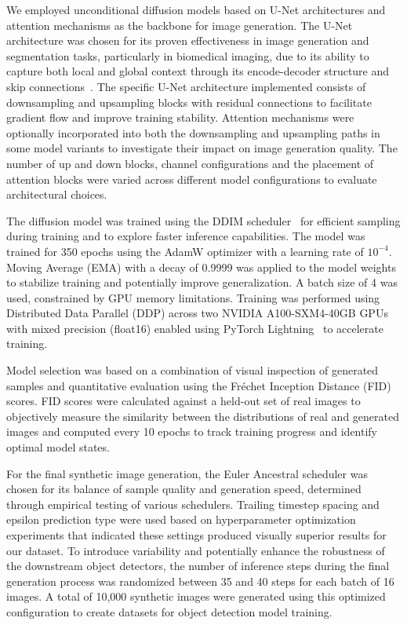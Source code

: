 We employed unconditional diffusion models based on U-Net architectures and attention mechanisms as the backbone for image generation.
The U-Net architecture was chosen for its proven effectiveness in image generation and segmentation tasks, particularly in biomedical imaging, due to its ability to capture both local and global context through its encode-decoder structure and skip connections~\cite{ronneberger_u-net_2015}.
The specific U-Net architecture implemented consists of downsampling and upsampling blocks with residual connections to facilitate gradient flow and improve training stability.
Attention mechanisms were optionally incorporated into both the downsampling and upsampling paths in some model variants to investigate their impact on image generation quality.
The number of up and down blocks, channel configurations and the placement of attention blocks were varied across different model configurations to evaluate architectural choices.

The diffusion model was trained using the DDIM scheduler~\cite{song_denoising_2020} for efficient sampling during training and to explore faster inference capabilities.
The model was trained for 350 epochs using the AdamW optimizer with a learning rate of $10^{-4}$.
Moving Average (EMA) with a decay of 0.9999 was applied to the model weights to stabilize training and potentially improve generalization.
A batch size of 4 was used, constrained by GPU memory limitations.
Training was performed using Distributed Data Parallel (DDP) across two NVIDIA A100-SXM4-40GB GPUs with mixed precision (float16) enabled using PyTorch Lightning~\cite{falcon_pytorchlightningpytorch-lightning_2020} to accelerate training.

Model selection was based on a combination of visual inspection of generated samples and quantitative evaluation using the Fréchet Inception Distance (FID) scores.
FID scores were calculated against a held-out set of real images to objectively measure the similarity between the distributions of real and generated images and computed every 10 epochs to track training progress and identify optimal model states.

For the final synthetic image generation, the Euler Ancestral scheduler was chosen for its balance of sample quality and generation speed, determined through empirical testing of various schedulers.
Trailing timestep spacing and epsilon prediction type were used based on hyperparameter optimization experiments that indicated these settings produced visually superior results for our dataset.
To introduce variability and potentially enhance the robustness of the downstream object detectors, the number of inference steps during the final generation process was randomized between 35 and 40 steps for each batch of 16 images.
A total of 10,000 synthetic images were generated using this optimized configuration to create datasets for object detection model training.

